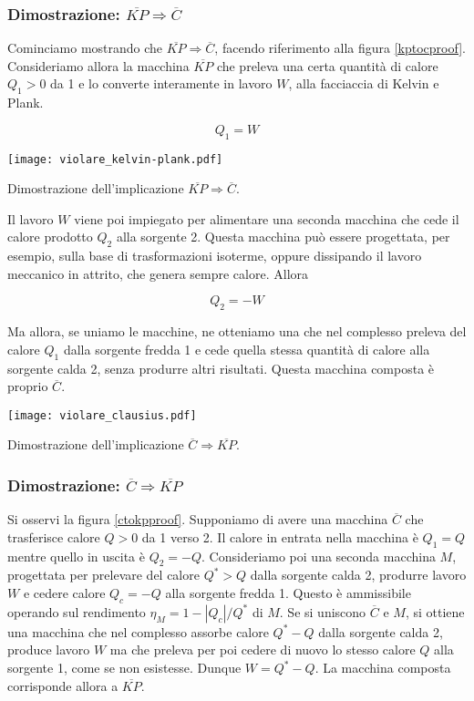 \subsubsection*{Dimostrazione: $\overline{KP} \Rightarrow \overline{C}$}
Cominciamo mostrando che $\overline{KP} \Rightarrow \overline{C}$,
facendo riferimento alla figura \ref{kptocproof}.
Consideriamo allora la macchina $\overline{KP}$ che preleva una
certa quantità di calore $Q_1 > 0$ da 1 e lo converte interamente
in lavoro $W$, alla facciaccia di Kelvin e Plank.

\[ Q_1 = W \]

\begin{marginfigure}
    \centering
    \texttt{[image: violare\_kelvin-plank.pdf]}
    \caption{Dimostrazione dell'implicazione $\overline{KP} \Rightarrow \overline{C}$.}
    \label{kptocproof}
\end{marginfigure}

\noindent Il lavoro $W$ viene poi impiegato per alimentare una
seconda macchina che cede il calore prodotto $Q_2$ alla sorgente
2. Questa macchina può essere progettata, per esempio, sulla base
di trasformazioni isoterme, oppure dissipando il lavoro meccanico
in attrito, che genera sempre calore. Allora

\[ Q_2 = -W \]

\noindent Ma allora,
se uniamo le macchine, ne otteniamo una che nel complesso preleva
del calore $Q_1$ dalla sorgente fredda 1 e cede quella stessa
quantità di calore alla sorgente calda 2, senza produrre altri
risultati. Questa macchina composta è proprio $\overline{C}$.

\begin{marginfigure}
    \centering
    \texttt{[image: violare\_clausius.pdf]}
    \caption{Dimostrazione dell'implicazione $\overline{C} \Rightarrow \overline{KP}$.}
    \label{ctokpproof}
\end{marginfigure}

\subsubsection*{Dimostrazione: $\overline{C} \Rightarrow \overline{KP}$}
Si osservi la figura \ref{ctokpproof}.
Supponiamo di avere una macchina $\overline{C}$ che trasferisce
calore $Q > 0$ da 1 verso 2. Il calore in entrata nella macchina è
$Q_1 = Q$ mentre quello in uscita è $Q_2 = -Q$.
Consideriamo poi una seconda macchina $M$, progettata per prelevare
del calore $Q^* > Q$ dalla sorgente calda 2, produrre lavoro $W$
e cedere calore $Q_c = -Q$ alla sorgente fredda 1. Questo è ammissibile
operando sul rendimento $\eta_M = 1 - |Q_c|/Q^*$ di $M$.
Se si uniscono $\overline{C}$ e $M$, si ottiene una macchina che nel
complesso assorbe calore $Q^* - Q$ dalla sorgente calda 2, produce
lavoro $W$ ma che preleva per poi cedere di nuovo lo stesso calore
$Q$ alla sorgente 1, come se non esistesse. Dunque $W = Q^* - Q$.
La macchina composta corrisponde allora a $\overline{KP}$.

